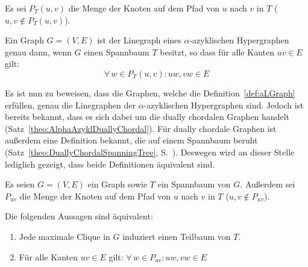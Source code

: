 \begin{mydef}\label{def:aLGraph}    
    Es sei $P_T(u,v)$ die Menge der Knoten auf dem Pfad von $u$ nach $v$ in $T$ ($u,v \notin P_T(u,v)$).
    
    Ein Graph $G=(V,E)$ ist der Linegraph eines $\alpha$-azyklischen Hypergraphen genau dann, wenn $G$ einen Spannbaum $T$ besitzt, so dass für alle Kanten $uv \in E$ gilt:
    \[ \forall\, w \in P_T(u,v):uw, vw \in E \]    
\end{mydef}

Es ist nun zu beweisen, dass die Graphen, welche die Definition~\ref{def:aLGraph} erfüllen, genau die Linegraphen der $\alpha$-azyklischen Hypergraphen sind. Jedoch ist bereits bekannt, dass es sich dabei um die dually chordalen Graphen handelt (Satz~\ref{theo:AlphaAzyklDuallyChordal}). Für dually chordale Graphen ist außerdem eine Definition bekannt, die auf einem Spannbaum beruht (Satz~\ref{theo:DuallyChordalSpanningTree}, S.~\pageref{theo:DuallyChordalSpanningTree}). Deswegen wird an dieser Stelle lediglich gezeigt, dass beide Definitionen äquivalent sind.

\begin{Theorem}\label{theo:SpanningTree}
    Es seien $G=(V,E)$ ein Graph sowie $T$ ein Spannbaum von $G$. Außerdem sei $P_{uv}$ die Menge der Knoten auf dem Pfad von $u$ nach $v$ in $T$ ($u,v \notin P_{uv}$).
    
    Die folgenden Aussagen sind äquivalent:
    \begin{enumerate}
        \item \label{case:CliqueInduceT} Jede maximale Clique in $G$ induziert einen Teilbaum von $T$.
        \item \label{case:PuvT} Für alle Kanten $uv \in E$ gilt: $\forall\, w \in P_{uv}:uw, vw \in E$
    \end{enumerate}
\end{Theorem}


